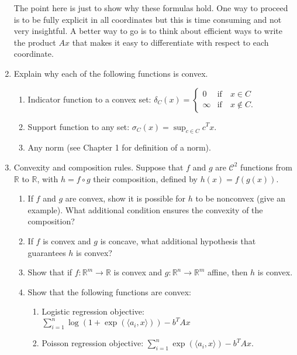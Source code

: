 \documentclass[11pt]{amsart}
\newcommand{\cC}{\mathcal{C}}
\begin{document}
\begin{enumerate}
The point here is just to show why these formulas hold. One way to proceed is to be fully explicit in all coordinates but this is time consuming and not very insightful. A better way to go is to think about efficient ways to write the 
product $Ax$ that makes it easy to differentiate with respect to each coordinate. 


\bigskip\bigskip


\item Explain why each of the following functions is convex. 

\begin{enumerate}
\item Indicator function to a convex set: 
\(
\delta_C(x) = \begin{cases} 0 & \mbox{if} \quad x \in C \\ \infty & \mbox{if} \quad x \not \in C. \end{cases}
\)

\item Support function to any set: 
\(
\sigma_C(x) = \sup_{c \in C} c^Tx.
\)

\item Any norm (see Chapter 1 for definition of a norm). 

\end{enumerate}

\bigskip\bigskip




\item  Convexity and composition rules. Suppose that $f$ and $g$ are $\cC^2$ functions from $\mathbb{R}$ to $\mathbb{R}$, with $h = f\circ g$ their composition, defined by 
\(
h(x) = f(g(x)).
\) 
\begin{enumerate}
\item If $f$ and $g$ are convex, show it is possible for $h$ to be nonconvex (give an example). What additional condition ensures 
the convexity of the composition? 
\item If $f$ is convex and $g$ is concave, what additional hypothesis that guarantees $h$ is convex? 
\item Show that if $f: \mathbb{R}^m \rightarrow \mathbb{R}$ is convex and $g: \mathbb{R}^n \rightarrow \mathbb{R}^m$ affine, then $h$ is convex. 
\item Show that the following functions are convex: 
\begin{enumerate}
\item Logistic regression objective: $\sum_{i=1}^n \log(1+\exp(\langle a_i, x\rangle))- b^TAx$
\item Poisson regression objective: $\sum_{i=1}^n \exp(\langle a_i, x \rangle) - b^TAx$. 
\end{enumerate}
\end{enumerate}




\end{enumerate}
\end{document}
